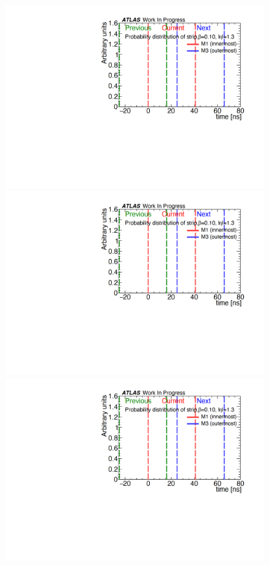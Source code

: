 \begin{figure}[tbp]
    \begin{minipage}{0.33\hsize}
    \centering   
    \includegraphics[width=\textwidth,page=11]{img/rec/rec_e1.3_s.pdf}
    \end{minipage}
    \begin{minipage}{0.33\hsize}
    \centering   
    \includegraphics[width=\textwidth,page=9]{img/rec/rec_e1.3_s.pdf}
    \end{minipage}
    \begin{minipage}{0.33\hsize}
    \centering   
    \includegraphics[width=\textwidth,page=7]{img/rec/rec_e1.3_s.pdf}

\end{minipage}
\end{figure}
